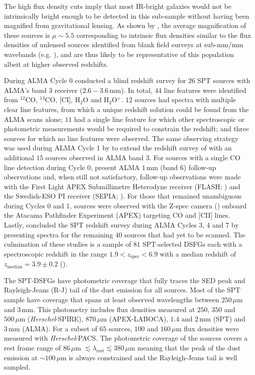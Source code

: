 The high flux density cuts imply that most IR-bright galaxies would not be intrinsically bright enough to be detected in this sub-sample without having been magnified from gravitational lensing. As shown by \citealt{Reuter_2020}, the average magnification of these sources is $\mu \sim 5.5$ corresponding to intrinsic flux densities similar to the flux densities of unlensed sources identified from blank field surveys at sub-mm/mm wavebands (e.g. \citealt{Coppin_2006, Pope_2006, Weiss_2009}), and are thus likely to be representative of this population albeit at higher observed redshifts.

During ALMA Cycle 0 \citealt{Weiss_2013} conducted a blind redshift survey for $26$ SPT sources with ALMA's band 3 receiver ($2.6 - 3.6\,$mm). In total, $44$ line features were identified from $^{12}$CO, $^{13}$CO, [CI], H$_2$O and H$_2$O$^+$. $12$ sources had spectra with multiple clear line features, from which a unique redshift solution could be found from the ALMA scans alone; $11$ had a single line feature for which other spectroscopic or photometric measurements would be required to constrain the redshift; and three sources for which no line features were observed. The same observing strategy was used during ALMA Cycle 1 by \citealt{Strandet_2016} to extend the redshift survey of \citealt{Weiss_2013} with an additional $15$ sources observed in ALMA band 3. For sources with a single CO line detection during Cycle 0, \citealt{Strandet_2016} present ALMA $1\,$mm (band 6) follow-up observations and, when still not satisfactory, follow-up observations were made with the First Light APEX Submillimetre Heterodyne receiver (FLASH; \citealt{Heyminck_2006}) and the Swedish-ESO PI receiver (SEPIA; \citealt{Billade_2012}). For those that remained unambiguous during Cycles 0 and 1, sources were observed with the Z-spec camera (\citealt{Naylor_2003}) onboard the Atacama Pathfinder Experiment (APEX) targeting CO and [CII] lines. Lastly, \citealt{Reuter_2020} concluded the SPT redshift survey during ALMA Cycles 3, 4 and 7 by presenting spectra for the remaining $40$ sources that had yet to be scanned. The culmination of these studies is a sample of $81$ SPT-selected DSFGs each with a spectroscopic redshift in the range $1.9 < z_{\textrm{spec}} < 6.9$ with a median redshift of $z_{\textrm{median}} = 3.9\pm0.2$ (\citealt{Reuter_2020}).

The SPT-DSFGs have photometric coverage that fully traces the SED peak and Rayleigh-Jeans (R-J) tail of the dust emission for all sources. Most of the SPT sample have coverage that spans at least observed wavelengths between $250\,\mu$m and $3\,$mm. This photometry includes flux densities measured at $250$, $350$ and $500\,\mu$m (\textit{Herschel}-SPIRE), $870\,\mu$m (APEX-LABOCA), $1.4$ and $2\,$mm (SPT) and $3\,$mm (ALMA). For a subset of $65$ sources, $100$ and $160\,\mu$m flux densities were measured with \textit{Herschel}-PACS. The photometric coverage of the sources covers a rest frame range of $86\,\mu$m $\lesssim \lambda_{\textrm{rest}} \lesssim 380\,\mu$m meaning that the peak of the dust emission at $\sim 100\,\mu$m is always constrained and the Rayleigh-Jeans tail is well sampled.

